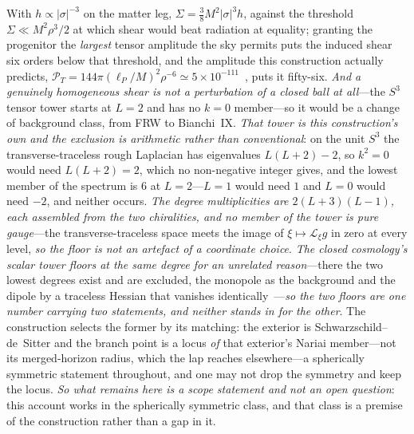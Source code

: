 \documentclass[11pt,a4paper]{article}
\theoremstyle{plain}
\theoremstyle{definition}
\theoremstyle{remark}
\begin{document}
With $h\propto|\sigma|^{-3}$ on the matter leg, $\Sigma=\tfrac38M^2|\sigma|^3h$, against the threshold $\Sigma\ll M^2\rho^3/2$ at which shear would beat radiation at equality; granting the progenitor the \emph{largest} tensor amplitude the sky permits puts the induced shear six orders below that threshold, and the amplitude this construction actually predicts, $\mathcal{P}_T=144\pi(\ell_P/M)^2\rho^{-6}\simeq5\times10^{-111}$~\cite{JanzenCRcosmology}, puts it fifty-six. \emph{And a genuinely homogeneous shear is not a perturbation of a closed ball at all}---the $S^3$ tensor tower starts at $L=2$ and has no $k=0$ member---so it would be a change of background class, from FRW to Bianchi~IX. \emph{That tower is this construction's own and the exclusion is arithmetic rather than conventional}: on the unit $S^3$ the transverse-traceless rough Laplacian has eigenvalues $L(L+2)-2$, so $k^2=0$ would need $L(L+2)=2$, which no non-negative integer gives, and the lowest member of the spectrum is $6$ at $L=2$---$L=1$ would need $1$ and $L=0$ would need $-2$, and neither occurs. \emph{The degree multiplicities are $2(L+3)(L-1)$, each assembled from the two chiralities, and no member of the tower is pure gauge}---the transverse-traceless space meets the image of $\xi\mapsto\mathcal{L}_\xi g$ in zero at every level, \emph{so the floor is not an artefact of a coordinate choice}. \emph{The closed cosmology's scalar tower floors at the same degree for an unrelated reason}---there the two lowest degrees exist and are excluded, the monopole as the background and the dipole by a traceless Hessian that vanishes identically~\cite{JanzenCRcosmology}---\emph{so the two floors are one number carrying two statements, and neither stands in for the other}. The construction selects the former by its matching: the exterior is Schwarzschild--de~Sitter and the branch point is a locus \emph{of} that exterior's Nariai member---not its merged-horizon radius, which the lap reaches elsewhere---a spherically symmetric statement throughout, and one may not drop the symmetry and keep the locus. \emph{So what remains here is a scope statement and not an open question}: this account works in the spherically symmetric class, and that class is a premise of the construction rather than a gap in it.
\end{document}
